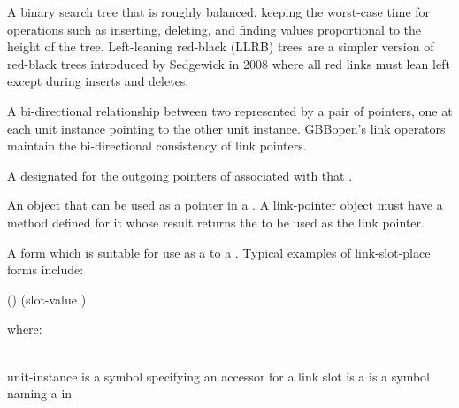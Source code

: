 \begin{glossary-list}

%
%
%
A binary search tree that is roughly balanced, keeping the worst-case time for
operations such as inserting, deleting, and finding values proportional to the
height of the tree. Left-leaning red-black (LLRB) trees are a simpler version
of red-black trees introduced by Sedgewick in 2008 where all red links must
lean left except during inserts and deletes.


\glent[link]
%
%
%
A bi-directional relationship between two  represented
by a pair of pointers, one at each unit instance pointing to the other unit
instance.  GBBopen's link operators maintain the bi-directional consistency of
link pointers.


%
%
%
A  designated for the outgoing pointers of 
associated with that .


%
%
%
%
%
%
%
%
An object that can be used as a pointer in a .  A
link-pointer object must have a 
method defined for it whose result returns the  to be
used as the link pointer.


%
%
%
%
A form which is suitable for use as a  to a
.  Typical examples of link-slot-place forms include:
%
\W\supp\notpretop
\T\vspace{4pt}
\begin{example}
  ()
  (slot-value )
\end{example}
where:
\W\\~\\
\begin{args}{unit-instance}
 is a symbol specifying an accessor  for
  a link slot
 is a 
 is a symbol naming a  in
\end{args}


\end{glossary-list}
